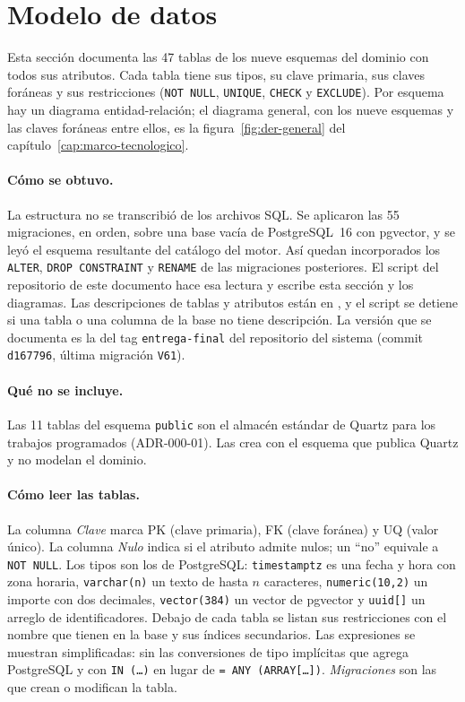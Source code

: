 \section{Modelo de datos}\label{sec:apx-modelo-datos}

Esta sección documenta las 47 tablas de los nueve esquemas del dominio
con todos sus atributos. Cada tabla tiene sus tipos, su clave primaria,
sus claves foráneas y sus restricciones (\texttt{NOT NULL},
\texttt{UNIQUE}, \texttt{CHECK} y \texttt{EXCLUDE}). Por esquema hay un
diagrama entidad-relación; el diagrama general, con los nueve esquemas y
las claves foráneas entre ellos, es la figura~\ref{fig:der-general} del
capítulo~\ref{cap:marco-tecnologico}.

\paragraph{Cómo se obtuvo.} La estructura no se transcribió de los
archivos SQL. Se aplicaron las 55 migraciones, en orden, sobre una base
vacía de PostgreSQL~16 con pgvector, y se leyó el esquema resultante del
catálogo del motor. Así quedan incorporados los \texttt{ALTER},
\texttt{DROP CONSTRAINT} y \texttt{RENAME} de las migraciones
posteriores. El script  del
repositorio de este documento hace esa lectura y escribe esta sección y
los diagramas. Las descripciones de tablas y atributos están en
, y el script se detiene si
una tabla o una columna de la base no tiene descripción. La versión que
se documenta es la del tag \texttt{entrega-final} del repositorio del
sistema (commit \texttt{d167796}, última migración \texttt{V61}).

\paragraph{Qué no se incluye.} Las 11 tablas  del esquema
\texttt{public} son el almacén estándar de Quartz para los trabajos
programados (ADR-000-01). Las crea  con el
esquema que publica Quartz y no modelan el dominio.

\paragraph{Cómo leer las tablas.} La columna \emph{Clave} marca PK
(clave primaria), FK (clave foránea) y UQ (valor único). La columna
\emph{Nulo} indica si el atributo admite nulos; un ``no'' equivale a
\texttt{NOT NULL}. Los tipos son los de PostgreSQL: \texttt{timestamptz}
es una fecha y hora con zona horaria, \texttt{varchar(n)} un texto de
hasta $n$ caracteres, \texttt{numeric(10,2)} un importe con dos
decimales, \texttt{vector(384)} un vector de pgvector y
\texttt{uuid[]} un arreglo de identificadores. Debajo de cada tabla se
listan sus restricciones con el nombre que tienen en la base y sus
índices secundarios. Las expresiones se muestran simplificadas: sin las
conversiones de tipo implícitas que agrega PostgreSQL y con
\texttt{IN (\ldots)} en lugar de \texttt{= ANY (ARRAY[\ldots])}.
\emph{Migraciones} son las que crean o modifican la tabla.

